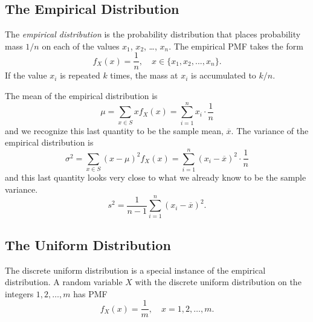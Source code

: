 \subsection{The Empirical Distribution}

\begin{defn}
The \emph{empirical distribution}  is the probability distribution
that places probability mass \(1/n\) on each of the values \(x_{1}\),
\(x_{2}\), \ldots{}, \(x_{n}\). The empirical PMF takes the form
\begin{equation} 
f_{X}(x)=\frac{1}{n},\quad x\in \{ x_{1},x_{2},...,x_{n} \}.
\end{equation}
If the value \(x_{i}\) is repeated \(k\) times, the mass at \(x_{i}\) is accumulated to \(k/n\).
\end{defn}

The mean of the empirical distribution is
\begin{equation}
\mu=\sum_{x\in S}xf_{X}(x)=\sum_{i=1}^{n}x_{i}\cdot\frac{1}{n}
\end{equation}
and we recognize this last quantity to be the sample mean, \(\overline{x}\). The variance of the empirical distribution is
\begin{equation}
\sigma^{2}=\sum_{x\in S}(x-\mu)^{2}f_{X}(x)=\sum_{i=1}^{n}(x_{i}-\overline{x})^{2}\cdot\frac{1}{n}
\end{equation}
and this last quantity looks very close to what we already know to be the sample variance.
\begin{equation}
s^{2}=\frac{1}{n-1}\sum_{i=1}^{n}(x_{i}-\overline{x})^{2}.
\end{equation}

\subsection{The Uniform Distribution}

The discrete uniform distribution is a special instance of the empirical distribution.
A random variable \(X\) with the discrete uniform distribution on the
integers \(1,2,\ldots,m\) has PMF
\begin{equation}
f_{X}(x)=\frac{1}{m},\quad x=1,2,\ldots,m.
\end{equation}

